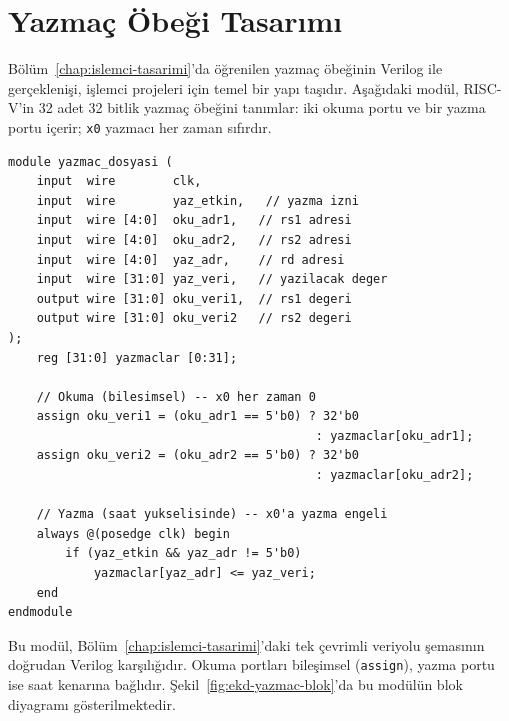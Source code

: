 \section{Yazmaç Öbeği Tasarımı}
\label{sec:ekd-yazmac-dosyasi}

Bölüm~\ref{chap:islemci-tasarimi}'da öğrenilen yazmaç öbeğinin Verilog ile gerçeklenişi, işlemci projeleri için temel bir yapı taşıdır. Aşağıdaki modül, RISC-V'in 32 adet 32 bitlik yazmaç öbeğini tanımlar: iki okuma portu ve bir yazma portu içerir; \texttt{x0} yazmacı her zaman sıfırdır.

\begin{lstlisting}[style=verilog, caption={RISC-V yazmaç öbeği (32$\times$32)}, label={lst:ekd-yazmac}]
module yazmac_dosyasi (
    input  wire        clk,
    input  wire        yaz_etkin,   // yazma izni
    input  wire [4:0]  oku_adr1,   // rs1 adresi
    input  wire [4:0]  oku_adr2,   // rs2 adresi
    input  wire [4:0]  yaz_adr,    // rd adresi
    input  wire [31:0] yaz_veri,   // yazilacak deger
    output wire [31:0] oku_veri1,  // rs1 degeri
    output wire [31:0] oku_veri2   // rs2 degeri
);
    reg [31:0] yazmaclar [0:31];

    // Okuma (bilesimsel) -- x0 her zaman 0
    assign oku_veri1 = (oku_adr1 == 5'b0) ? 32'b0
                                           : yazmaclar[oku_adr1];
    assign oku_veri2 = (oku_adr2 == 5'b0) ? 32'b0
                                           : yazmaclar[oku_adr2];

    // Yazma (saat yukselisinde) -- x0'a yazma engeli
    always @(posedge clk) begin
        if (yaz_etkin && yaz_adr != 5'b0)
            yazmaclar[yaz_adr] <= yaz_veri;
    end
endmodule
\end{lstlisting}

Bu modül, Bölüm~\ref{chap:islemci-tasarimi}'daki tek çevrimli veriyolu şemasının doğrudan Verilog karşılığıdır. Okuma portları bileşimsel (\texttt{assign}), yazma portu ise saat kenarına bağlıdır. Şekil~\ref{fig:ekd-yazmac-blok}'da bu modülün blok diyagramı gösterilmektedir.

